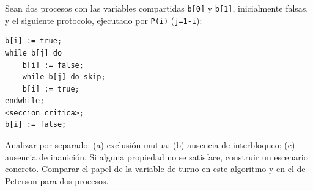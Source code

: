\documentclass[11pt,a4paper,oneside]{report}
\begin{document}
\begin{ejercicio}
Sean dos procesos con las variables compartidas \texttt{b[0]} y \texttt{b[1]}, inicialmente falsas, y el
siguiente protocolo, ejecutado por \texttt{P(i)} (\texttt{j=1-i}):
\begin{lstlisting}
b[i] := true;
while b[j] do
    b[i] := false;
    while b[j] do skip;
    b[i] := true;
endwhile;
<seccion critica>;
b[i] := false;
\end{lstlisting}
Analizar por separado: (a) exclusión mutua; (b) ausencia de interbloqueo; (c) ausencia de inanición. Si alguna
propiedad no se satisface, construir un escenario concreto. Comparar el papel de la variable de turno en este
algoritmo y en el de Peterson para dos procesos.
\end{ejercicio}
\end{document}
